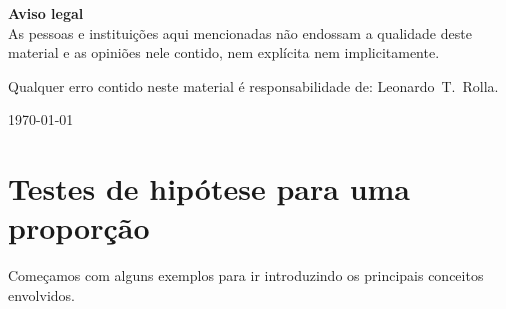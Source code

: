 \documentclass[12pt,a4paper]{article}
\newcommand{\myauthor}{Leonardo~T.~Rolla}
\theoremstyle{plain}
\theoremstyle{definition}
\theoremstyle{remark}
\begin{document}
\vspace{1em}

\textbf{Aviso legal}
\\
\noindent
As pessoas e instituições aqui mencionadas não endossam a qualidade deste material e as opiniões nele contido, nem explícita nem implicitamente.

\noindent
Qualquer erro contido neste material é responsabilidade de: \myauthor.

\vspace{1em}

\hfill
\today

\vfill
\vfill

\thispagestyle{empty}


\cleardoublepage


\section{Testes de hipótese para uma proporção}

Começamos com alguns exemplos para ir introduzindo os principais conceitos envolvidos.
\end{document}
